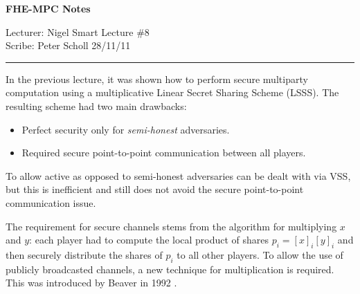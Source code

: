 \documentclass[11pt]{article}
\begin{document}
\thispagestyle{empty}


\begin{center}
\bf\large FHE-MPC Notes
\end{center}

\noindent
Lecturer: Nigel Smart               %
\hfill
Lecture \#8               %
\\
Scribe: Peter Scholl                 %
\hfill
28/11/11                         %

\noindent
\rule{\textwidth}{1pt}

\medskip


\newcommand{\mb}[1] {\mathbf{#1}}
\newcommand{\Norm}[1]{\Vert #1 \Vert}
\newcommand{\round}[1]{\lceil #1 \rfloor}


In the previous lecture, it was shown how to perform secure multiparty
computation using a multiplicative Linear Secret Sharing Scheme (LSSS). The
resulting scheme had two main drawbacks:

\begin{itemize}
\item Perfect security only for \textit{semi-honest} adversaries.
\item Required secure point-to-point communication between all players.
\end{itemize}
To allow active as opposed to semi-honest adversaries can be 
dealt with via VSS, but this is inefficient and still does not 
avoid the secure point-to-point communication issue.

The requirement for secure channels stems from the algorithm for multiplying
$x$ and $y$: each player had to compute the local product of shares $p_i = [x]_i[y]_i$
and then securely distribute the shares of $p_i$ to all other players.
To allow the use of publicly broadcasted channels, a new technique for
multiplication is required. This was introduced by Beaver in 1992 \cite{Beaver1992}.
\end{document}
